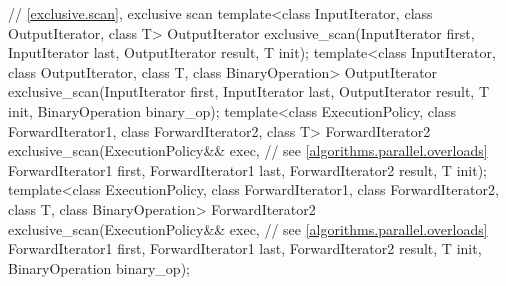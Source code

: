 \begin{codeblock}
{  // \ref{exclusive.scan}, exclusive scan
  template<class InputIterator, class OutputIterator, class T>
    OutputIterator exclusive_scan(InputIterator first, InputIterator last,
                                  OutputIterator result,
                                  T init);
  template<class InputIterator, class OutputIterator, class T, class BinaryOperation>
    OutputIterator exclusive_scan(InputIterator first, InputIterator last,
                                  OutputIterator result,
                                  T init, BinaryOperation binary_op);
  template<class ExecutionPolicy, class ForwardIterator1, class ForwardIterator2, class T>
    ForwardIterator2 exclusive_scan(ExecutionPolicy&& exec, // see \ref{algorithms.parallel.overloads}
                                    ForwardIterator1 first, ForwardIterator1 last,
                                    ForwardIterator2 result,
                                    T init);
  template<class ExecutionPolicy, class ForwardIterator1, class ForwardIterator2, class T,
           class BinaryOperation>
    ForwardIterator2 exclusive_scan(ExecutionPolicy&& exec, // see \ref{algorithms.parallel.overloads}
                                    ForwardIterator1 first, ForwardIterator1 last,
                                    ForwardIterator2 result,
                                    T init, BinaryOperation binary_op);

}
\end{codeblock}
